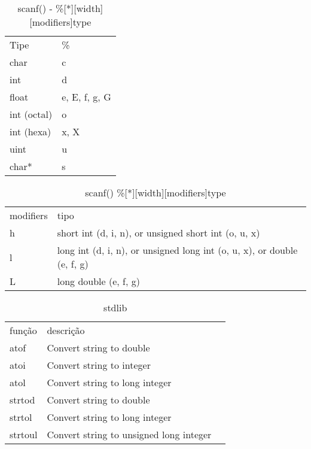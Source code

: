 \documentclass[a4paper,twocolumn, 10pt, landscape]{article}
\begin{document}
\begin{table}
\begin{tabular}{ll}
Tipe & \% \\ 
char & c \\ 
int & d \\ 
float & e, E, f, g, G \\ 
int (octal) & o \\ 
int (hexa) & x, X \\ 
uint & u \\ 
char* & s
\end{tabular}
\caption{scanf() - \%[*][width][modifiers]type}
\label{tipos}
\end{table}

\begin{table}
 \begin{tabular}{ll}
modifiers & tipo \\ 
h & short int (d, i, n), or unsigned short int (o, u, x) \\ 
l & long int (d, i, n), or unsigned long int (o, u, x), or double (e, f, g) \\ 
L & long double (e, f, g) \\ 
\end{tabular}
\caption{scanf() \%[*][width][modifiers]type}
\label{modifiers}
\end{table}


\begin{table}
 \begin{tabular}{lll}
função & descrição \\
atof & Convert string to double \\
atoi & Convert string to integer \\
atol & Convert string to long integer \\
strtod & Convert string to double \\
strtol & Convert string to long integer \\
strtoul & Convert string to unsigned long integer \\
\end{tabular}
\caption{stdlib}
\label{stdlib functions}
\end{table}
\end{document}
